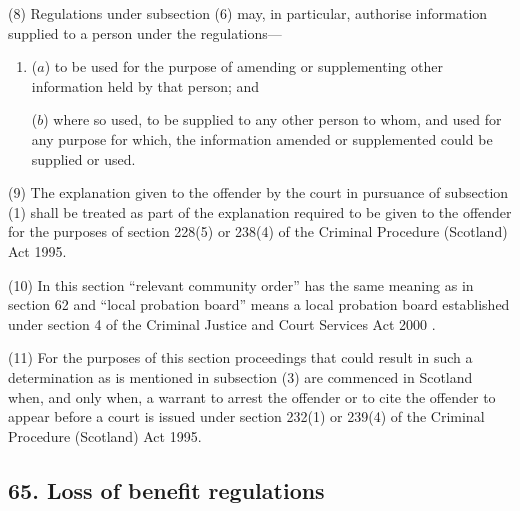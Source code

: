 \documentclass[12pt,a4paper]{article}
\begin{document}
(8) Regulations under subsection (6)  may, in particular, authorise information supplied to a person under the regulations—
\begin{enumerate}\item[]
($a$) to be used for the purpose of amending or supplementing other information held by that person; and

($b$) where so used, to be supplied to any other person to whom, and used for any purpose for which, the information amended or supplemented could be supplied or used.
\end{enumerate}

(9) The explanation given to the offender by the court in pursuance of subsection (1)  shall be treated as part of the explanation required to be given to the offender for the purposes of section 228(5)  or 238(4)  of the Criminal Procedure (Scotland) Act 1995. 

(10) In this section “relevant community order” has the same meaning as in section 62
and “local probation board” means a local probation board established under section 4 of the Criminal Justice and Court Services Act 2000%
. 

(11) For the purposes of this section proceedings that could result in such a determination as is mentioned in subsection (3)  are commenced in Scotland when, and only when, a warrant to arrest the offender or to cite the offender to appear before a court is issued under section 232(1)  or 239(4)  of the Criminal Procedure (Scotland) Act 1995. 


\subsection{65. Loss of benefit regulations}
\end{document}
